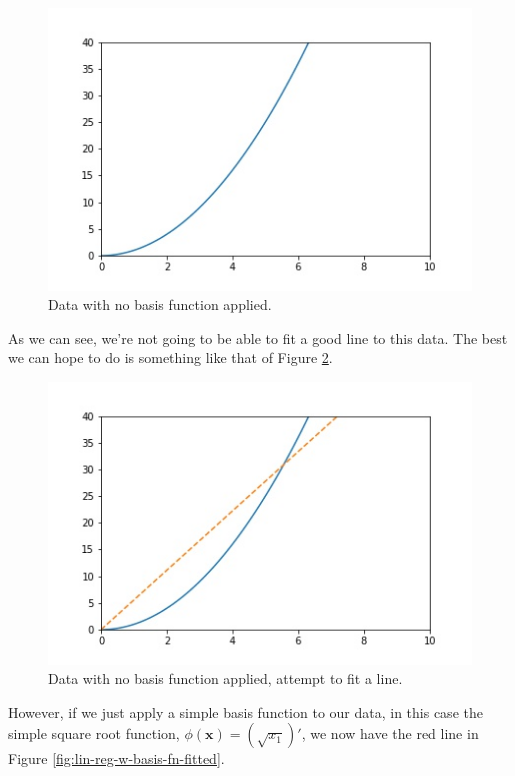 \begin{figure}
    \centering
    \includegraphics[width=0.5\paperwidth]{../LinearRegression/fig/lin_reg_no_basis_fn_GEN.jpg}
    \caption{Data with no basis function applied.}
    \label{fig:lin-reg-no-basis-fn}
\end{figure}

As we can see, we're not going to be able to fit a good line to this data. The best we can hope to do is something like that of Figure \ref{fig:lin-reg-no-basis-fn-fitted}.

\begin{figure}
    \centering
    \includegraphics[width=0.5\paperwidth]{../LinearRegression/fig/lin_reg_no_basis_fn_fitted_GEN.jpg}
    \caption{Data with no basis function applied, attempt to fit a line.}
    \label{fig:lin-reg-no-basis-fn-fitted}
\end{figure}

However, if we just apply a simple basis function to our data, in this case the simple square root function, $\phi(\textbf{x}) = (\sqrt{x_{1}})'$, we now have the red line in Figure \ref{fig:lin-reg-w-basis-fn-fitted}.

